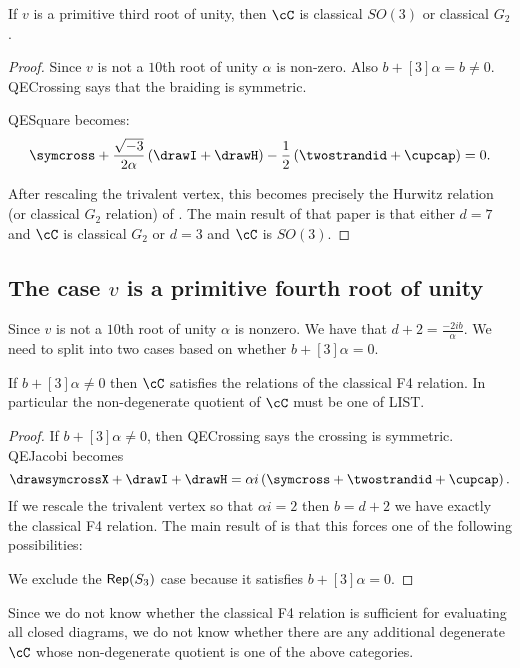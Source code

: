 \documentclass[12pt]{amsart}
\begin{document}
\begin{proposition}
If $v$ is a primitive third root of unity, then $\cC$ is classical $SO(3)$ or classical $G_2$.
\end{proposition}
\begin{proof}
Since $v$ is not a $10$th root of unity $\alpha$ is non-zero.  Also $b+[3]\alpha = b \neq 0$.  QECrossing says that the braiding is symmetric.  

QESquare becomes:
$$\symcross+\frac{\sqrt{-3}}{2\alpha} \left(\drawI + \drawH \right) -\frac{1}{2} \left(\twostrandid + \cupcap \right) = 0.$$

After rescaling the trivalent vertex, this becomes precisely the Hurwitz relation (or classical $G_2$ relation) of \cite{???}.  The main result of that paper is that either $d = 7$ and $\cC$ is classical $G_2$ or $d=3$ and $\cC$ is $SO(3)$.
\end{proof}

\subsection{The case $v$ is a primitive fourth root of unity}

Since $v$ is not a $10$th root of unity $\alpha$ is nonzero.  We have that $d+2 = \frac{-2ib}{\alpha}$.
We need to split into two cases based on whether $b+[3]\alpha = 0$.  

\begin{proposition}
If $b+[3]\alpha \neq 0$ then $\cC$ satisfies the relations of the classical F4 relation.  In particular the non-degenerate quotient of $\cC$ must be one of LIST.
\end{proposition}
\begin{proof}
If $b+[3]\alpha \neq 0$, then QECrossing says the crossing is symmetric.   QEJacobi becomes
$$\drawsymcrossX + \drawI + \drawH = \alpha i \left(\symcross + \twostrandid + \cupcap \right).$$  If we rescale the trivalent vertex so that $\alpha i = 2$ then $b = d+2$ we have exactly the classical F4 relation.  The main result of \cite{???} is that this forces one of the following possibilities:


We exclude the $\operatorname{\mathsf{Rep}}(S_3)$ case because it satisfies $b+[3]\alpha = 0$.
\end{proof}

Since we do not know whether the classical F4 relation is sufficient for evaluating all closed diagrams, we do not know whether there are any additional degenerate $\cC$ whose non-degenerate quotient is one of the above categories.
\end{document}
